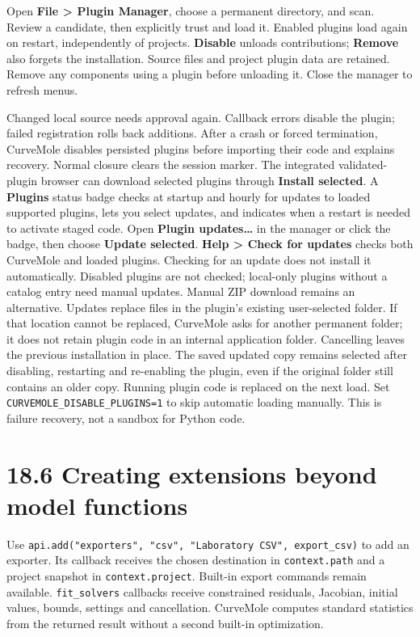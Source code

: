 \documentclass[
  10pt,
  a4paper,
  oneside]{scrreprt}
\begin{document}
Open \textbf{File \textgreater{} Plugin Manager}, choose a permanent
directory, and scan. Review a candidate, then explicitly trust and load
it. Enabled plugins load again on restart, independently of projects.
\textbf{Disable} unloads contributions; \textbf{Remove} also forgets the
installation. Source files and project plugin data are retained. Remove
any components using a plugin before unloading it. Close the manager to
refresh menus.

Changed local source needs approval again. Callback errors disable the
plugin; failed registration rolls back additions. After a crash or
forced termination, CurveMole disables persisted plugins before
importing their code and explains recovery. Normal closure clears the
session marker. The integrated validated-plugin browser can download
selected plugins through \textbf{Install selected}. A \textbf{Plugins}
status badge checks at startup and hourly for updates to loaded
supported plugins, lets you select updates, and indicates when a restart
is needed to activate staged code. Open \textbf{Plugin updates\ldots{}}
in the manager or click the badge, then choose \textbf{Update selected}.
\textbf{Help \textgreater{} Check for updates} checks both CurveMole and
loaded plugins. Checking for an update does not install it
automatically. Disabled plugins are not checked; local-only plugins
without a catalog entry need manual updates. Manual ZIP download remains
an alternative. Updates replace files in the plugin's existing
user-selected folder. If that location cannot be replaced, CurveMole
asks for another permanent folder; it does not retain plugin code in an
internal application folder. Cancelling leaves the previous installation
in place. The saved updated copy remains selected after disabling,
restarting and re-enabling the plugin, even if the original folder still
contains an older copy. Running plugin code is replaced on the next
load. Set \texttt{CURVEMOLE\_DISABLE\_PLUGINS=1} to skip automatic
loading manually. This is failure recovery, not a sandbox for Python
code.

\newpage

\hypertarget{creating-extensions-beyond-model-functions}{%
\section{18.6 Creating extensions beyond model
functions}\label{creating-extensions-beyond-model-functions}}

Use
\texttt{api.add("exporters",\ "csv",\ "Laboratory\ CSV",\ export\_csv)}
to add an exporter. Its callback receives the chosen destination in
\texttt{context.path} and a project snapshot in
\texttt{context.project}. Built-in export commands remain available.
\texttt{fit\_solvers} callbacks receive constrained residuals, Jacobian,
initial values, bounds, settings and cancellation. CurveMole computes
standard statistics from the returned result without a second built-in
optimization.
\end{document}
